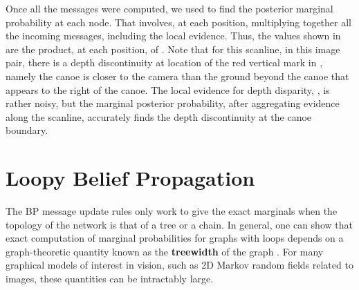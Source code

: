Once all the messages were computed, we used \eqn{\ref{eq:bpmarginal}} to find the posterior marginal probability at each node. That involves, at each position, multiplying together all the incoming messages, including the local evidence.  Thus, the values shown in  are the product, at each position, of .
Note that for this scanline, in this image pair, there is a depth discontinuity at location of the red vertical mark in \fig{\ref{fig:canoe4}}, namely the canoe is closer to the camera than the ground beyond the canoe that appears to the right of the canoe.  The local evidence for depth disparity, , is rather noisy, but the marginal posterior probability, after aggregating evidence along the scanline, accurately finds the depth discontinuity at the canoe boundary.

\section{Loopy Belief Propagation}

The BP message update rules only work to give the exact marginals when
the topology of the network is that of a tree or a chain.   In general, one can show that exact
computation of marginal probabilities for graphs with loops depends on
a graph-theoretic quantity known as the {\bf treewidth} of the graph \cite{Koller2009}.  For
many graphical models of interest in vision, such as 2D Markov random
fields related to images, these quantities can be intractably large.

